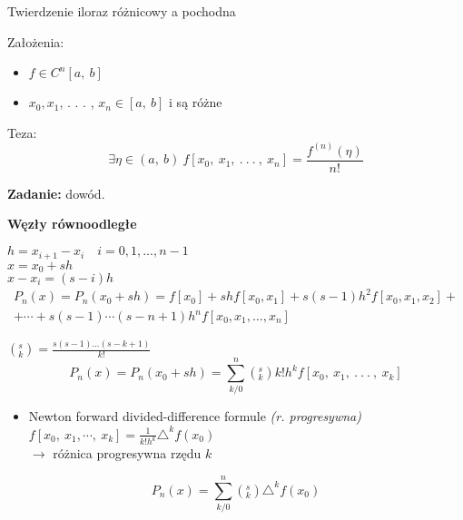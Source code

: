 \begin{frame}

\begin{block}
{Twierdzenie iloraz różnicowy a pochodna}

Założenia:
\begin{itemize}
\item $f\in C^{n}[a,\ b]$
\item $x_{0}, x_{1}$, . . . , $x_{n}\in[a,\ b] $ i są różne
\end{itemize}

Teza:
$$
\exists\eta\in(a,\ b)\ f[x_{0},\ x_{1},\ .\ .\ .\ ,\ x_{n}]=\frac{f^{(n)}(\eta)}{n!}
$$
\end{block}
\vspace{5mm}

\textbf{Zadanie:} dowód.
\end{frame}

\begin{frame}
\textbf{Węzły równoodległe}

$h=x_{i+1}-x_{i} \quad i=0, 1, ..., n-1$ \\
$x=x_{0}+sh$ \\
$x-x_{i}=(s-i)h$ \\

\begin{equation*} \begin{split} P_{n}(x)=P_{n}(x_{0}+sh) = f[x_{0}]+shf[x_{0}, x_{1}]+s(s - 1)h^{2}f[x_{0},x_{1},x_{2}]+ \\ 
+ \cdots +s(s-1)\cdots(s-n+1)h^{n}f[x_{0},x_{1},\dots ,x_{n}] \end{split} \end{equation*}

$(_{k}^{s})=\displaystyle \frac{s(s-1)\ldots(s-k+1)}{k!}$
$$
P_{n}(x)=P_{n}(x_{0}+sh)=\sum_{k/0}^{n}(_{k}^{s})k!h^{k}f[x_{0},\ x_{1},\ .\ .\ .\ ,\ x_{k}]
$$
\end{frame}

\begin{frame}
\begin{itemize}
\item Newton forward divided-difference formule {\it (r. progresywna)} \\
\vspace{2mm}
$f[x_{0},\displaystyle \ x_{1},\cdots,\ x_{k}]=\frac{1}{k!h^{k}}\triangle^{k}f(x_{0})$ \\
\vspace{3mm}
$\rightarrow$ różnica progresywna rzędu $k$
\end{itemize}

$$P_{n}(x)=\displaystyle \sum_{k/0}^{n}(_{k}^{s})\triangle^{k}f(x_{0})$$
\end{frame}


